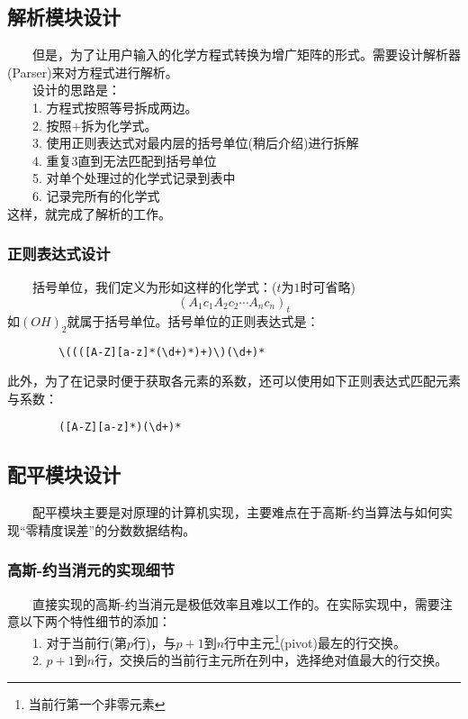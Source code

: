 \documentclass[1pt]{article}
\begin{document}
  \subsection{解析模块设计}
    　　但是，为了让用户输入的化学方程式转换为增广矩阵的形式。需要设计解析器(Parser)来对方程式进行解析。\\
    　　设计的思路是：\\
    　　1. 方程式按照等号拆成两边。\\
    　　2. 按照$+$拆为化学式。\\
    　　3. 使用正则表达式对最内层的括号单位(稍后介绍)进行拆解\\
    　　4. 重复3直到无法匹配到括号单位\\
    　　5. 对单个处理过的化学式记录到表中\\
    　　6. 记录完所有的化学式\\
    这样，就完成了解析的工作。\\
    \subsubsection{正则表达式设计}
      　　括号单位，我们定义为形如这样的化学式：($t$为$1$时可省略)\\
      \begin{equation}
        (A_{1}c_{1}A_{2}c_{2}\cdots{}A_{n}c_{n})_{t}
      \end{equation}
      如$(OH)_{2}$就属于括号单位。括号单位的正则表达式是：\\
      \begin{lstlisting}
        \((([A-Z][a-z]*(\d+)*)+)\)(\d+)*
      \end{lstlisting}
      此外，为了在记录时便于获取各元素的系数，还可以使用如下正则表达式匹配元素与系数：\\
      \begin{lstlisting}
        ([A-Z][a-z]*)(\d+)*
      \end{lstlisting}
  \subsection{配平模块设计}
    　　配平模块主要是对原理的计算机实现，主要难点在于高斯-约当算法与如何实现“零精度误差”的分数数据结构。
    \subsubsection{高斯-约当消元的实现细节}
      　　直接实现的高斯-约当消元是极低效率且难以工作的。在实际实现中，需要注意以下两个特性细节的添加：\\
      　　1. 对于当前行(第$p$行)，与$p+1$到$n$行中主元\footnote{当前行第一个非零元素}(pivot)最左的行交换。\\
      　　2. $p+1$到$n$行，交换后的当前行主元所在列中，选择绝对值最大的行交换。
\end{document}
